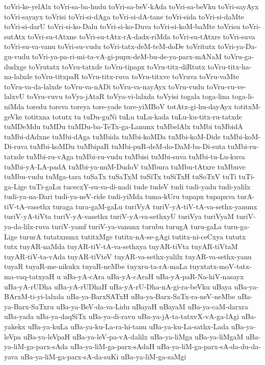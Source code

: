 {toVri-ke-yelAlx
toVri-sa-ba-hudu
toVri-sa-beV-kAda
toVri-sa-beVku
toVri-sayAyx
toVri-sayayx
toVrisi
toVri-si-dAga
toVri-si-dA-tane
toVri-sida
toVri-si-daMte
toVri-si-darU
toVri-si-ko-Dalu
toVri-si-ko-Duva
toVri-si-koM-baMte
toVrisu
toVri-sutAtx
toVri-su-tAtxne
toVri-su-tAtx-rA-dadx-riMda
toVri-su-tAtxre
toVri-suva
toVri-su-va-vanu
toVri-su-vudu
toVri-tatx-deM-teM-doDe
toVritutx
toVri-ya-Da-gu-vudu
toVri-ya-pa-ri-mi-ta-vA-gi-pupx-deM-bu-de-ya-parx-mANaM
toVru-ga-dudxge
toVrutatx
toVru-tatxde
toVru-tipapx
toVru-titx-diRtutx
toVru-titx-ha-na-lalxde
toVru-titxpaR
toVru-titx-ruva
toVru-titxve
toVruva
toVru-vaMte
toVru-va-da-lalxde
toVru-va-nADi
toVru-va-nayAyx
toVru-vudu
toVru-vu-ve-lalxvU
toVru-vuvu
toVya-jAtaR
toVya-vi-lalxda
toVyisi
togala
toga-lina
toga-li-niMda
toredu
toreva
toreya
tore-yade
tore-yiMBoV
totAtx-gi-hu-dayAyx
totitxM-geVke
totitxna
totutx
tu
tuDu-guNi
tuLu
tuLu-kada
tuLu-ku-titx-ru-tatxde
tuMDeMdu
tuMDu
tuMDu-ba-TeTx-ga-Lanunx
tuMbelAlx
tuMbi
tuMbidA
tuMbi-dAdxne
tuMbi-dAga
tuMbida
tuMbi-koMDa
tuMbi-koM-Dide
tuMbi-koM-Di-ruva
tuMbi-koMDu
tuMbipaR
tuMbi-puR-deM-do-DaM-ba-Di-suta
tuMbi-ru-tatxde
tuMbi-ru-vAga
tuMbi-ru-vudu
tuMbisi
tuMbi-suva
tuMbi-tu-Lu-kuva
tuMbi-yA-LA-padA
tuMbi-ya-nuM-DudoV
tuMbura
tuMbu-tAtxre
tuMbuve
tuMbu-vudu
tuMga-tara
tuSaTx
tuSaTxM
tuSiTx
tuSiTxH
tuSoTxV
tuTi
tuTi-ga-Lige
tuTi-gaLu
tucecxY-su-va-di-nadi
tude
tudeV
tudi
tudi-yadu
tudi-yalilx
tudi-ya-na-Dari
tudi-ya-neV-ride
tudi-yiMda
tuma-kUru
tupapx
tupapxva
turA-tiV-tA-vasethx
turaga
tura-gaM-gaLu
turiVyA
turiV-yA-tiV-tA-va-sethx-yanunx
turiV-yA-tiVta
turiV-yA-vasethx
turiV-yA-va-sethxyU
turiVya
turiVyaM
turiV-ya-da-lilx-ruva
turiV-yamf
turiV-ya-vanunx
turubu
turugA
turu-gaLa
turu-ga-Lige
tururA
tutatxnunx
tutitxMge
tutitx-nA-se-gAgi
tutitx-ni-ceCxya
tututx
tutx
tuyAR-naMda
tuyAR-tiV-tA-va-sethxya
tuyAR-tiVta
tuyAR-tiVtaM
tuyAR-tiV-ta-vAda
tuyAR-tiVteV
tuyAR-va-sethx-yalilx
tuyAR-va-sethx-yanu
tuyaR
tuyaR-me-nikukx
tuyaR-neMbe
tuyxru-ta-rA-maLa
tuyxtatx-moV-tatx-ma-vaq-tatxyaH
u
uBa-yA-cAra
uBa-yA-cAraH
uBa-yA-paR-Na-hiV-nasayx
uBa-yA-rUDha
uBa-yA-rUDhaH
uBa-yA-rU-Dha-nA-gi-ra-beVku
uBaya
uBa-ya-BArxM-ti-yi-lalxda
uBa-ya-BarxSATxH
uBa-ya-Barx-SaTx-ra-neV-neMbe
uBa-ya-Barx-SaTxru
uBa-ya-BeV-da-va-Lidu
uBayaH
uBayaM
uBa-ya-caM-darxra
uBa-yada
uBa-ya-daqSiTx
uBa-ya-di-ravu
uBa-ya-jA-ta-tatxvX-vA-ga-lAgi
uBa-yakekx
uBa-ya-kuLa
uBa-ya-ku-La-ra-hi-tanu
uBa-ya-ku-La-sathx-Lada
uBa-ya-leVpa
uBa-ya-leVpaH
uBa-ya-leV-pa-vA-dalilx
uBa-ya-liMga
uBa-ya-liMgaM
uBa-ya-liM-ga-parx-sAda
uBa-ya-liM-ga-parx-sAdaH
uBa-ya-liM-ga-parx-sA-da-du-da-yava
uBa-ya-liM-ga-parx-sA-da-suKi
uBa-ya-liM-ga-saMgi
}
